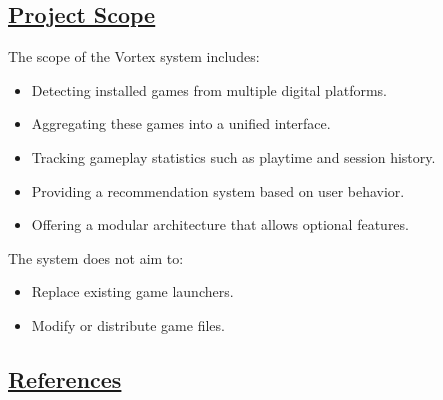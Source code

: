 \subsection{\underline{Project Scope}}
The scope of the Vortex system includes:
\begin{itemize}
    \item Detecting installed games from multiple digital platforms.
    \item Aggregating these games into a unified interface.
    \item Tracking gameplay statistics such as playtime and session history.
    \item Providing a recommendation system based on user behavior.
    \item Offering a modular architecture that allows optional features.
\end{itemize}

The system does not aim to:
\begin{itemize}
    \item Replace existing game launchers.
    \item Modify or distribute game files.
\end{itemize}

\subsection{\underline{References}}
\nocite{*}
\printbibliography

